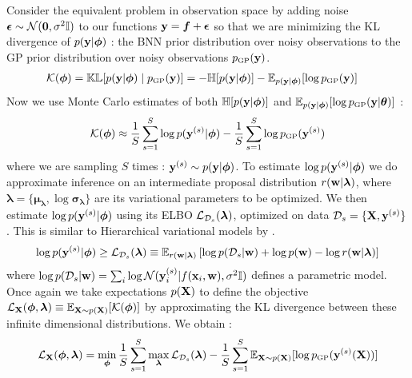 \documentclass{article}
\begin{document}
Consider the equivalent problem in observation space by adding noise 
$\bm \epsilon \sim \mathcal{N}( \mathbf{0} , \sigma ^2 \mathbb{I})$ to our functions 
$ \mathbf{y}  =\bm f + \bm \epsilon$ so that we are minimizing the KL divergence of  
 $p ( \mathbf{y}  |  \bm \phi ) $ : the BNN prior distribution over noisy observations 
 to the GP prior distribution over noisy observations   $\pgp (\B y )$.  
\begin{align}
    \mathcal K (\bm \phi)&= \kl [p (\B y |  \bm \phi ) \mid   \pgp (\B y )] 
    = -\entropy [p (\B y |  \bm \phi ) ] 
        - \E_{p (\B y |  \bm \phi ) } [\log \pgp (\B y ) ] 
\end{align}
Now we use Monte Carlo estimates of both $\mathbb{H} [p ( \mathbf{y}  |  \bm \phi ) ]$ and
$ \E_{p (\B y |  \bm \phi ) } [\log \pgp (\B y | \bm \theta ) ]$  :
\begin{align}
        \mathcal K (\bm \phi) \approx \frac{1}{S} \sum_{s=1}^S \log p (\B y ^{(s)}|  \bm \phi) 
    									 -\frac{1}{S} \sum_{s=1}^S \log \pgp (\B y ^{(s)}) 	
\end{align}
where we are sampling $S$ times : $  \mathbf{y}  ^{(s)} \sim  p ( \mathbf{y}  |  \bm \phi )$.
To estimate $  \log p ( \mathbf{y}  ^{(s)}|  \bm \phi) $ we do approximate inference on an intermediate proposal 
distribution $r ( \mathbf{w}  |\bm \lambda) $, where 
$\bm \lambda = \{ \bm \mu _{\bm \lambda} , \log \bm \sigma _{\bm \lambda}  \}$ 
are its variational parameters to be optimized. We then estimate  $  \log p ( \mathbf{y}  ^{(s)}|  \bm \phi) $ 
using its ELBO $ \mathcal{L} _{\mathcal{D} _s } (\bm \lambda) $, optimized on data $\mathcal{D} _s =\{ \mathbf{X}  ,  \mathbf{y}  ^{(s)} \}$.
This is similar to Hierarchical variational models by \cite{hvm}. 
\begin{align}
 \log p ( \mathbf{y}  ^{(s)}|  \bm \phi)  \geq \mathcal{L} _{\mathcal{D} _s } (\bm \lambda) 
 \equiv \mathbb{E} _{r( \mathbf{w}  |\bm \lambda )} \left[ { \log p(\mathcal{D}_s |  \mathbf{w} )+\log p( \mathbf{w} ) - \log r( \mathbf{w}  |\bm \lambda )  } \right] 
 \end{align}
where $\log p(\mathcal{D}_s |  \mathbf{w} ) = \sum_i \log \mathcal{N} ( \mathbf{y} _i ^{(s)} | f( \mathbf{x} _i,  \mathbf{w} ), \sigma ^2\mathbb{I} )$ defines a parametric model. 
Once again we take expectations $p( \mathbf{X} )$ to define the objective 
$\mathcal{L} _{ \mathbf{X} } (\bm \phi, \bm \lambda) \equiv \mathbb{E} _{ \mathbf{X}  \sim p( \mathbf{X} )} [\mathcal K  (\bm \phi) ]$  
by approximating the KL divergence between these infinite dimensional distributions. We obtain : 
\begin{align}
\elbo _\X (\bm \phi, \bm \lambda) 
 = \min _{\bm \phi} \frac{1}{S} \sum_{s=1}^S \max_{\bm \lambda}  \elbo _{\D _s} (\bm \lambda) 
 - \frac{1}{S} \sum_{s=1}^S  \E_{\X \sim p(\B X)} [\log \pgp (\B y ^{(s)}(\X))] 
\end{align}
\end{document}
